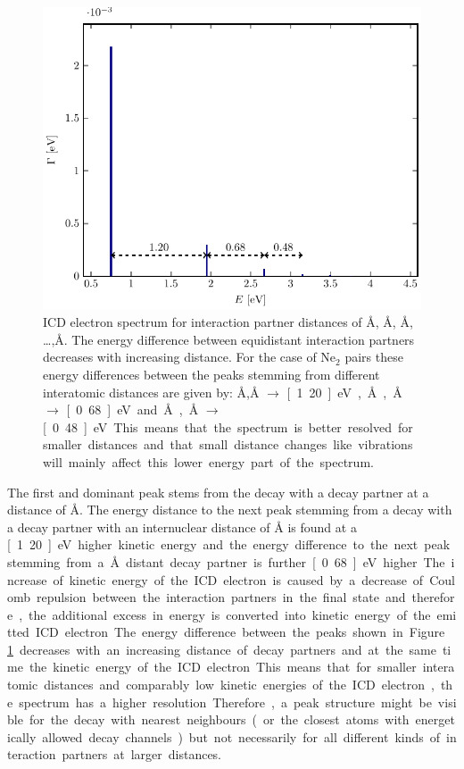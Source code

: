 \begin{figure}[h]
 \centering
 \includegraphics[width=\columnwidth]{pics/model_EGamma.pdf}
 \caption{ICD electron spectrum for interaction partner distances of
          \unit[3]{\AA}, \unit[4]{\AA}, \unit[5]{\AA}, \dots ,\unit[11]{\AA}.
          The energy difference between equidistant interaction partners
          decreases with increasing distance. For the case of Ne$_2$ pairs
          these energy differences between the peaks stemming from different
          interatomic distances are given by:
          \unit[3]{\AA},\unit[4]{\AA} $\rightarrow$ \unit[1.20]{eV},
          \unit[4]{\AA},\unit[5]{\AA} $\rightarrow$ \unit[0.68]{eV} and
          \unit[5]{\AA},\unit[6]{\AA} $\rightarrow$ \unit[0.48]{eV}.
          This means that the spectrum is better resolved for smaller distances
          and that small distance changes like vibrations will mainly affect
          this lower energy part of the spectrum.
}
 \label{figure:model_EGamma}
\end{figure}

The first and dominant peak stems from the decay with a decay
partner at a distance of \unit[3]{\AA}. The energy distance to the next peak
stemming from a decay with a decay partner with an internuclear distance of
\unit[4]{\AA} is found at a \unit[1.20]{eV} higher kinetic energy and the
energy difference to the next peak stemming from a \unit[5]{\AA} distant
decay partner is further \unit[0.68]{eV} higher. The increase of kinetic
energy of the ICD electron is caused by a decrease of Coulomb repulsion between
the interaction partners in the final state and therefore, the additional
excess in energy is converted into kinetic energy of the emitted ICD electron.
The energy difference between the peaks shown in Figure \ref{figure:model_EGamma}
decreases with an increasing distance of decay partners and at the same time
the kinetic energy
of the ICD electron. This means that for smaller interatomic distances and
comparably low kinetic energies of the ICD electron, the spectrum has a higher
resolution.
Therefore, a peak structure might be visible for the decay with nearest
neighbours (or the closest atoms with energetically allowed decay channels)
but not necessarily for all different kinds of interaction partners at larger
distances.


